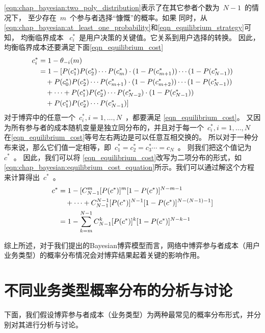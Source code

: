 \eqref{eqn:chap_bayesian:two_poly_distribution}表示了在其它参者个数为~$N-1$~的情况下，
至少存在~$m$~个参与者选择“慷慨”的概率。如果
同时，从\eqref{eqn:chap_bayesian:at_least_one_probability}和\eqref{eqn_equilibrium_strategy}可知，
均衡临界成本 ~$c_i^*$~是用户决策的关键值。它关系到用户选择的转换。
因此，均衡临界成本还要满足下面\eqref{eqn_equilibrium_cost}
\begin{align}
    c_i^* &= 1 - \theta_{-i} (m) \notag \\
     & =1 - [P(c_1^*)P(c_2^*)\cdots P(c_{m}^*) \cdot (1-P(c_{m+1}^*)) \cdots(1-P(c_{N-1}^*)) \notag \\ 
    & \quad +  P(c_0^*)P(c_2^*)\cdots P(c_{m+1}^*) \cdot (1-P(c_{m+2}^*)) \cdots(1-P(c_{N-1}^*)) \notag \\ 
    & \quad + \cdots  + P(c_1^*)P(c_2^*)\cdots P(c_{N-2}^*) \cdot (1-P(c_{N-1}^*)) \notag \\
    & \quad +  P(c_1^*)P(c_2^*)\cdots P(c_{N-1}^*) ]
    \label{eqn_equilibrium_cost} 
\end{align}
对于博弈中的任意一个~$c_i^*, i=1,\ldots, N$~，都要满足
\eqref{eqn_equilibrium_cost}。
又因为所有参与者的成本随机变量是独立同分布的，并且对于每一个~$c_i^*, i=1,\ldots, N$~
在\eqref{eqn_equilibrium_cost}等号左右两边是可以任意互相交换的。
所以对于一种分布来说，那么它们值一定相等，即~$c_1^* = c_2^* = c_3^* \cdots = c_N$~。
则我们把这个值记为~$c^*$~。
因此，我们可以将 \eqref{eqn_equilibrium_cost}改写为二项分布的形式，如
\eqref{eqn:chap_bayesian:equilibrium_cost_equation}所示。我们可以通过解这个方程来计算得出~$c^*$~。
\begin{align}  
    c^* & =  1 - [ C_{N-1}^m [P(c^*)]^m [1-P(c^*)]^{N-m-1} \notag \\
   & \quad + \cdots + C_{N-1}^{N-1} [P(c^*)]^{N-1} [1-P(c^*)]^{N-(N-1)-1} ]\notag \\
   &= 1- \sum_{k=m}^{N-1}C_{N-1}^k [P(c^*)]^k [1-P(c^*)]^{N-k-1}
\label{eqn:chap_bayesian:equilibrium_cost_equation}
\end{align}

综上所述，对于我们提出的Bayesian博弈模型而言，网络中博弈参与者成本（用户业务类型）的概率分布情况会对博弈结果起着关键的影响作用。
\section{不同业务类型概率分布的分析与讨论}
下面，我们假设博弈参与者成本（业务类型）为两种最常见的概率分布形式，并分别对其进行分析与讨论。
